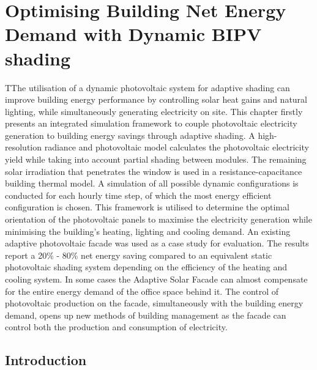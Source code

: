 
\chapter{Optimising Building Net Energy Demand with Dynamic BIPV shading}
\label{ch:asfSimulation}

\graphicspath{{chapters/ch2asfSimulation//Images/}}

\begin{chapterabstract}
TThe utilisation of a dynamic photovoltaic system for adaptive shading can improve building energy performance by controlling solar heat gains and natural lighting, while simultaneously generating electricity on site. This chapter firstly presents an integrated simulation framework to couple photovoltaic electricity generation to building energy savings through adaptive shading. A high-resolution radiance and photovoltaic model calculates the photovoltaic electricity yield while taking into account partial shading between modules. The remaining solar irradiation that penetrates the window is used in a resistance-capacitance building thermal model. A simulation of all possible dynamic configurations is conducted for each hourly time step, of which the most energy efficient configuration is chosen. This framework is utilised to determine the optimal orientation of the photovoltaic panels to maximise the electricity generation while minimising the building's heating, lighting and cooling demand.  An existing adaptive photovoltaic facade was used as a case study for evaluation. The results report a 20\% - 80\% net energy saving compared to an equivalent static photovoltaic shading system depending on the efficiency of the heating and cooling system. In some cases the Adaptive Solar Facade can almost compensate for the entire energy demand of the office space behind it. The control of photovoltaic production on the facade, simultaneously with the building energy demand, opens up new methods of building management as the facade can control both the production and consumption of electricity.
\end{chapterabstract}


\newpage

\section{Introduction}
\label{ch:introduction2}


